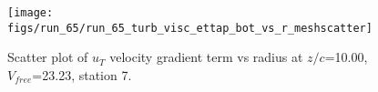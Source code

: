 \begin{figure}[H]
\centering
\texttt{[image: figs/run\_65/run\_65\_turb\_visc\_ettap\_bot\_vs\_r\_meshscatter]}
\caption{Scatter plot of $
u_T$ velocity gradient term vs radius at $z/c$=10.00, $V_{free}$=23.23, station 7.}
\end{figure}


